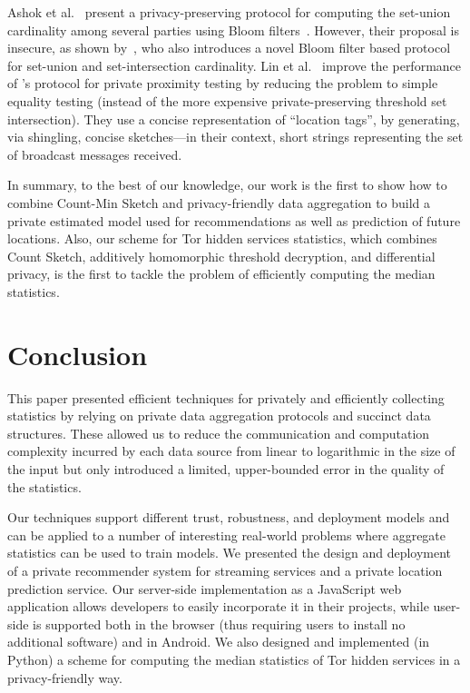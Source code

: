 \documentclass[conference]{IEEEtran}
\begin{document}
Ashok et al.~\cite{ashok2014scalable} present a privacy-preserving protocol for computing the set-union cardinality among several parties using Bloom filters~\cite{bloom1970space}. However, their proposal is insecure, as shown by~\cite{egertprivately}, who also introduces a novel Bloom filter based protocol for set-union and set-intersection cardinality. 
Lin et al.~\cite{lin2012efficient} improve the performance of \cite{narayanan2011location}'s protocol for private proximity testing by reducing the problem to simple equality testing (instead of the more expensive private-preserving threshold set intersection). They use a concise representation of ``location tags'', by generating, via shingling, concise sketches---in their context, short strings representing the set of broadcast messages received. 

In summary, to the best of our knowledge, our work is the first to show how to combine Count-Min Sketch and privacy-friendly data aggregation to build a private estimated model used for recommendations as well as prediction of future locations. Also, our scheme for Tor hidden services statistics, which combines Count Sketch, additively homomorphic threshold decryption, and differential privacy, is the first to tackle the problem of efficiently computing the median statistics.

\section{Conclusion}\label{sec:conclusion}
This paper presented efficient techniques for privately and efficiently collecting statistics by relying on private data aggregation protocols and succinct data structures.
These allowed us to reduce the communication and computation complexity incurred by each data source from linear to logarithmic in the size of the input but only introduced a limited, upper-bounded error in the quality of the statistics.

Our techniques support different trust, robustness, and deployment models and can be applied to a number of interesting real-world problems where aggregate statistics can be used to train models. We presented the design and deployment of a private recommender system for streaming services and a private location prediction service. Our server-side implementation as a JavaScript web application allows developers to easily incorporate it in their projects, while user-side is supported both in the browser (thus requiring users to install no additional software) and in Android.
We also designed and implemented (in Python) a scheme for computing the median statistics of Tor hidden services in a privacy-friendly way.
\end{document}
